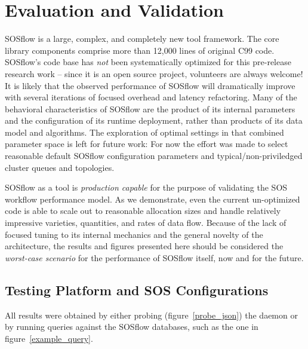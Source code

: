 
\section{Evaluation and Validation}

SOSflow is a large, complex, and completely new tool framework. The
core library components comprise more than 12,000 lines of original
C99 code. SOSflow's code base has \textit{not} been systematically
optimized for this pre-release research work -- since it is an open
source project, volunteers are always welcome! It is likely that the
observed performance of SOSflow will dramatically improve with several
iterations of focused overhead and latency refactoring. Many of the
behavioral characteristics of SOSflow are the product of its internal
parameters and the configuration of its runtime deployment, rather
than products of its data model and algorithms. The exploration of
optimal settings in that combined parameter space is left for future
work: For now the effort was made to select reasonable default SOSflow
configuration parameters and typical/non-priviledged cluster
queues and topologies.

SOSflow as a tool is \textit{production capable} for the purpose of
validating the SOS workflow performance model. As we demonstrate, even
the current un-optimized code is able to scale out to reasonable
allocation sizes and handle relatively impressive varieties,
quantities, and rates of data flow. Because of the lack of focused
tuning to its internal mechanics and the general novelty of the
architecture, the results and figures presented here should be
considered the \textit{worst-case scenario} for the performance of
SOSflow itself, now and for the future.

\subsection{Testing Platform and SOS Configurations}
All results were obtained by either probing (figure~\ref{probe_json})
the daemon or by running queries against the SOSflow databases, such
as the one in figure~\ref{example_query}.

